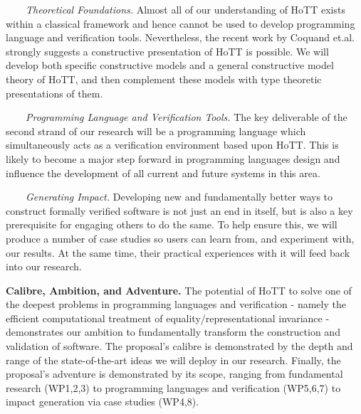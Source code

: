 \documentclass[a4paper,11pt]{article}
\begin{document}



$\;\;\; \;\;\;$ {\em Theoretical Foundations.} Almost all of our understanding
  of HoTT exists within a classical framework and hence cannot be used
  to develop programming language and verification tools. Nevertheless, the recent
  work by Coquand et.al.~\cite{BezemM:cubsmt} strongly suggests a constructive presentation of HoTT
  is possible. We will develop both specific constructive models
  and a general constructive model theory of HoTT, and then complement
  these models with type theoretic presentations of them.

$\;\;\;\;\;\;$ {\em Programming Language and Verification Tools.} The key
  deliverable of the second strand of our research will be a
  programming language which simultaneously acts as a verification
  environment based upon HoTT. This is likely to become a major
  step forward in programming languages design and influence
  the development of all current and future systems in this area.

$\;\;\;\;\;\;$ {\em Generating Impact.} Developing new and fundamentally
  better ways to construct formally verified software is not just an
  end in itself, but is also a key prerequisite for engaging others to
  do the same.  To help ensure this, we will produce a number of case studies so
  users can learn from, and experiment with, our results. At the same time, their
  practical experiences with it will feed back into our research.

  {\bf Calibre, Ambition, and Adventure.} The potential of HoTT to
  solve one of the deepest problems in programming languages and
  verification - namely the efficient computational treatment of
  equality/representational invariance - demonstrates our ambition to
  fundamentally transform the construction and validation of software.
  The proposal's calibre is demonstrated by the depth and range
  of the state-of-the-art ideas we will deploy in our
  research. Finally, the proposal's adventure
  is demonstrated by its scope, ranging from fundamental research
  (WP1,2,3) to programming languages and verification (WP5,6,7) 
  to impact generation via case studies (WP4,8).
\end{document}
